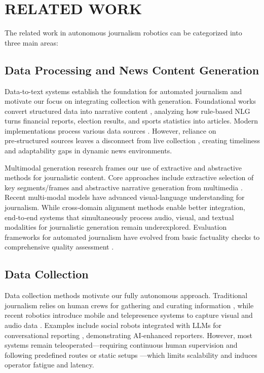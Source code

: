 \documentclass[letterpaper, 10 pt, conference]{ieeeconf}  %
\begin{document}
\section{RELATED WORK}

The related work in au\-ton\-omous journalism robotics can be categorized into three main areas: 

\subsection{Data Processing and News Content Generation}

Data-to-text systems establish the foundation for automated journalism and motivate our focus on integrating collection with generation. Foundational works convert structured data into narrative content \cite{diakopoulos2019automating,graefe2016guide,montana2020automating}, analyzing how rule-based NLG turns financial reports, election results, and sports statistics into articles. Modern implementations process various data sources \cite{reuters_tracer2017,xiaomingbot2020,blab_reporter2022}. However, reliance on pre‑structured sources leaves a disconnect from live collection \cite{diakopoulos2019automating,graefe2016guide}, creating timeliness and adaptability gaps in dynamic news environments.

Multi\-modal generation research frames our use of extractive and abstractive methods for jour\-nal\-is\-tic content. Core approaches include extractive selection of key segments/frames and abstractive narrative generation from multimedia \cite{video_summarization_2024}. Recent multi-modal models \cite{li2024llava,videollama3_2025,blip22023} have advanced visual-language understanding for journalism. While cross‑domain alignment methods \cite{mhms2022} enable better integration, end‑to‑end systems that simultaneously process audio, visual, and textual modalities \cite{li2024llava,videollama3_2025} for jour\-nal\-is\-tic generation remain underexplored. Evaluation frameworks for automated journalism have evolved from basic factuality checks \cite{selfcheckgpt2023,factscore2023} to comprehensive quality assessment \cite{qafacteval2021}.

\subsection{Data Collection}

Data collection methods motivate our fully au\-ton\-omous approach. Traditional journalism relies on human crews for gathering and curating information \cite{pew2021newsroom}, while recent robotics introduce mobile and telepresence systems to capture visual and audio data \cite{adversarial_data_collection_2025,sharedassembly_2025,robots_diary_studies_2025}. Examples include social robots integrated with LLMs for conversational reporting \cite{newsgpt2023}, demonstrating AI‑enhanced reporters. However, most systems remain teleoperated—requiring continuous human supervision and following predefined routes or static setups \cite{adversarial_data_collection_2025,sharedassembly_2025,robots_diary_studies_2025}—which limits scalability and induces operator fatigue and latency. 
\end{document}
